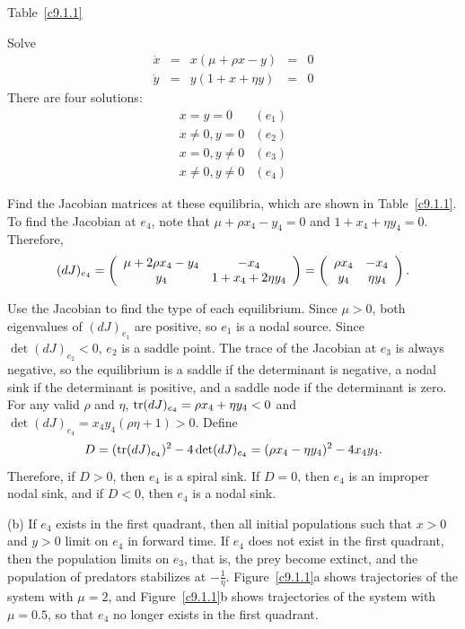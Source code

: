 \documentclass{ximera}
\begin{document}
\begin{exercise}
\begin{solution}
\begin{table}[htb]
\begin{center}
\vspace{0.2in}
Table~\ref{c9.1.1}
\end{center}
\end{table}

\soln
Solve
\[
\begin{array}{rcccl}
\dot{x} & = & x(\mu + \rho x - y) & = & 0 \\
\dot{y} & = & y(1 + x + \eta y) & = & 0 \end{array}
\]
There are four solutions:
\[
\begin{array}{lr}
x = y = 0 & (e_1) \\
x \neq 0, y = 0 & (e_2) \\
x = 0, y \neq 0 & (e_3) \\
x \neq 0, y \neq 0 & (e_4) \end{array}
\]

Find the Jacobian matrices at these equilibria, which are shown in
Table~\ref{c9.1.1}.  To find the Jacobian at $e_4$, note that
$\mu + \rho x_4 - y_4 = 0$ and $1 + x_4 + \eta y_4 = 0$.  Therefore,
\[
(dJ)_{e_4} = \left(\begin{array}{cc} \mu + 2\rho x_4 - y_4 & -x_4\\ y_4 &1 + x_4 +
2\eta y_4\end{array}\right) = \left(\begin{array}{cc} \rho x_4 & -x_4\\ y_4 &\eta y_4\end{array}\right).
\]

Use the Jacobian to find the type of each equilibrium.  Since $\mu > 0$,
both eigenvalues of $(dJ)_{e_1}$ are positive, so $e_1$ is a nodal source. 
Since $\det(dJ)_{e_2} < 0$, $e_2$ is a saddle point.  The trace of the
Jacobian at $e_3$ is always negative, so the equilibrium is a saddle if the
determinant is negative, a nodal sink if the determinant is positive, and
a saddle node if the determinant is zero.
For any valid $\rho$ and $\eta$, ${\rm tr}(dJ)_{e_4} = \rho x_4 +
\eta y_4 < 0$ and $\det(dJ)_{e_4} = x_4y_4(\rho\eta + 1) > 0$.
Define
\[
D = ({\rm tr}(dJ)_{e_4})^2 - 4\det(dJ)_{e_4} =
(\rho x_4 - \eta y_4)^2 - 4x_4y_4.
\]
Therefore, if $D > 0$, then $e_4$ is a spiral sink.  If $D = 0$, then
$e_4$ is an improper nodal sink, and if $D < 0$, then $e_4$ is a nodal
sink.

(b) If $e_4$ exists in the first quadrant, then all initial
populations such that $x > 0$ and $y > 0$ limit on $e_4$ in forward time. 
If $e_4$ does not exist in the first quadrant, then the population limits on
$e_3$, that is, the prey become extinct, and the population of predators
stabilizes at $-\frac{1}{\eta}$.  Figure~\ref{c9.1.1}a shows trajectories
of the system with $\mu = 2$, and Figure~\ref{c9.1.1}b shows trajectories
of the system with $\mu = 0.5$, so that $e_4$ no longer exists in the first
quadrant.


\end{solution}
\end{exercise}
\end{document}
